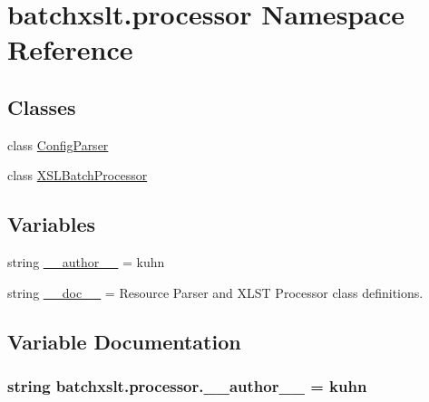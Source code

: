 \hypertarget{namespacebatchxslt_1_1processor}{}\section{batchxslt.\+processor Namespace Reference}
\label{namespacebatchxslt_1_1processor}
\subsection*{Classes}
\begin{DoxyCompactItemize}
\item 
class \hyperlink{classbatchxslt_1_1processor_1_1_config_parser}{Config\+Parser}
\item 
class \hyperlink{classbatchxslt_1_1processor_1_1_x_s_l_batch_processor}{X\+S\+L\+Batch\+Processor}
\end{DoxyCompactItemize}
\subsection*{Variables}
\begin{DoxyCompactItemize}
\item 
string \hyperlink{namespacebatchxslt_1_1processor_a4158fea92c844d042fbdba51228fad6a}{\+\_\+\+\_\+author\+\_\+\+\_\+} = \textquotesingle{}kuhn\textquotesingle{}
\item 
string \hyperlink{namespacebatchxslt_1_1processor_ad92d28e39ae8cc54cc5e25c98cb3136e}{\+\_\+\+\_\+doc\+\_\+\+\_\+} = \textquotesingle{}Resource Parser and X\+L\+S\+T Processor class definitions.\textquotesingle{}
\end{DoxyCompactItemize}


\subsection{Variable Documentation}
\hypertarget{namespacebatchxslt_1_1processor_a4158fea92c844d042fbdba51228fad6a}{}
\subsubsection[{\+\_\+\+\_\+author\+\_\+\+\_\+}]{\setlength{\rightskip}{0pt plus 5cm}string batchxslt.\+processor.\+\_\+\+\_\+author\+\_\+\+\_\+ = \textquotesingle{}kuhn\textquotesingle{}}\label{namespacebatchxslt_1_1processor_a4158fea92c844d042fbdba51228fad6a}
\hypertarget{namespacebatchxslt_1_1processor_ad92d28e39ae8cc54cc5e25c98cb3136e}{}
